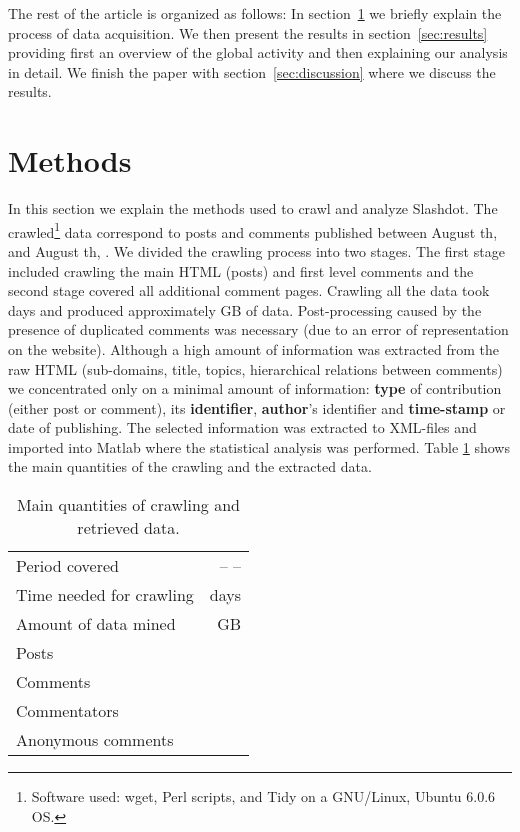 \documentclass[twoside,11pt]{article}
\begin{document}
The rest of the article is organized as follows: In
section~\ref{sec:methods} we briefly explain the process of data
acquisition.  We then present the results in section~\ref{sec:results}
providing first an overview of the global activity and then explaining
our analysis in detail.  We finish the paper with
section~\ref{sec:discussion} where we discuss the results.

\section{Methods}
\label{sec:methods}\noindent
In this section we explain the methods used to crawl and analyze
Slashdot.  The crawled\footnote{Software used: wget, Perl scripts, and
  Tidy on a GNU/Linux, Ubuntu 6.0.6 OS.}  data correspond to posts and
comments published between August th,  and August th,
.  We divided the crawling process into two stages.  The first
stage included crawling the main HTML (posts) and first level comments
and the second stage covered all additional comment pages.  Crawling
all the data took  days and produced approximately  GB of
data.  Post-processing caused by the presence of duplicated comments
was necessary (due to an error of representation on the website).
Although a high amount of information was extracted from the raw HTML
(sub-domains, title, topics, hierarchical relations between comments)
we concentrated only on a minimal amount of information: \textbf{type}
of contribution (either post or comment), its \textbf{identifier},
\textbf{author}'s identifier and \textbf{time-stamp} or date of
publishing.  The selected information was extracted to XML-files and
imported into Matlab where the statistical analysis was performed.
Table \ref{table:main} shows the main quantities of the crawling and
the extracted data.  \vspace{-12pt}
\begin{table}[!hb]
\centering
\caption{Main quantities of crawling and retrieved data. \vspace{6pt}}
\begin{tabular}{lr}
  Period covered            & --  --\\
  Time needed for crawling   &  days\\
  Amount of data mined       &  GB\\ 
  Posts                 &  \\ 
  Comments              &  \\ 
Commentators          &  \\ 
  Anonymous comments         & 
\end{tabular}
\label{table:main}
\end{table}
\end{document}
